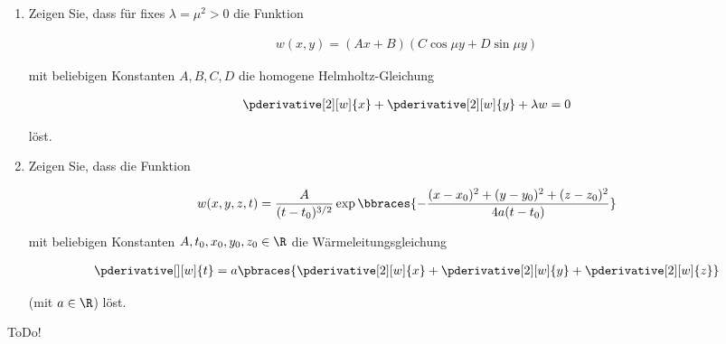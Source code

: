 
\begin{exercise}

\phantom{}

\begin{enumerate}[label = (\roman*)]

    \item Zeigen Sie, dass für fixes $\lambda = \mu^2 > 0$ die Funktion

    \begin{align*}
        w(x, y) = (Ax + B)(C \cos{\mu y} + D \sin{\mu y})
    \end{align*}

    mit beliebigen Konstanten $A, B, C, D$ die homogene Helmholtz-Gleichung

    \begin{align*}
        \pderivative[2][w]{x}
        +
        \pderivative[2][w]{y}
        +
        \lambda w = 0
    \end{align*}

    löst.

    \item Zeigen Sie, dass die Funktion
    
    \begin{align*}
        w(x, y, z, t)
        =
        \frac{A}{(t - t_0)^{3/2}}
        \exp
        {
            \bbraces
            {
                -\frac
                {
                    (x - x_0)^2
                    +
                    (y - y_0)^2
                    +
                    (z - z_0)^2
                }{
                    4 a (t - t_0)
                }
            }
        }
    \end{align*}

    mit beliebigen Konstanten $A, t_0, x_0, y_0, z_0 \in \R$ die Wärmeleitungsgleichung

    \begin{align*}
        \pderivative[][w]{t}
        =
        a \pbraces
        {
            \pderivative[2][w]{x}
            +
            \pderivative[2][w]{y}
            +
            \pderivative[2][w]{z}
        }
    \end{align*}

    (mit $a \in \R$) löst.

\end{enumerate}

\end{exercise}


\begin{solution}

ToDo!

\end{solution}

